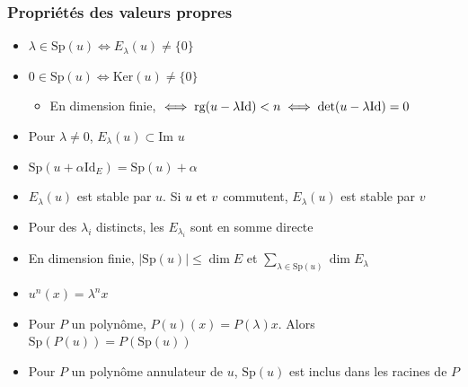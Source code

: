 \documentclass[openany]{book}
\begin{document}
\subsubsection{Propriétés des valeurs propres}
\begin{itemize}
    \item $\lambda \in \text{Sp}(u) \iff E_\lambda (u) \neq \{0\}$
    \item $0 \in \text{Sp}(u) \iff \text{Ker}(u) \neq \{0\}$
    \begin{itemize}
        \item En dimension finie, $\iff \text{rg}(u - \lambda \text{Id}) < n \iff \det(u - \lambda \text{Id}) = 0$
    \end{itemize}
    \item Pour $\lambda \neq 0$, $E_\lambda(u) \subset \text{Im } u$
    \item $\text{Sp}(u + \alpha \text{Id}_E) = \text{Sp}(u) + \alpha$
    \item $E_\lambda (u)$ est stable par $u$. Si $u \text{ et } v$ commutent, $E_\lambda (u)$ est stable par $v$
    \item Pour des $\lambda_i$ distincts, les $E_{\lambda_i}$ sont en somme directe
    \item En dimension finie, $|\text{Sp}(u)| \leq \dim E$ et $\sum_{\lambda \in \text{Sp}(u)}\dim E_{\lambda}$ 
    \item $u^n (x) = \lambda^n x$
    \item Pour $P$ un polynôme, $P(u)(x) = P(\lambda) x$. Alors $\text{Sp}(P(u)) = P(\text{Sp}(u))$
    \item Pour $P$ un polynôme annulateur de $u$, $\text{Sp}(u)$ est inclus dans les racines de $P$ 
\end{itemize}
\end{document}
